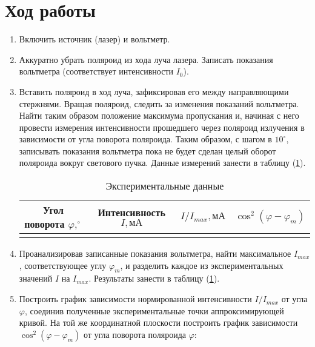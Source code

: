 \documentclass[12pt]{article}
\let\oldref\ref
\renewcommand{\ref}[1]{(\oldref{#1})}
\begin{document}
    \section*{Ход работы}
    \begin{enumerate}[wide, labelwidth=!, labelindent=0pt]
        \item Включить источник (лазер) и вольтметр.
        \item Аккуратно убрать поляроид из хода луча лазера. Записать показания вольтметра (соответствует интенсивности  $ I_0 $).
        \item Вставить поляроид в ход луча, зафиксировав его между направляющими стержнями. Вращая поляроид, следить за изменения показаний вольтметра. Найти таким образом положение максимума пропускания и, начиная с него провести измерения интенсивности прошедшего через поляроид излучения в зависимости от угла поворота поляроида. Таким образом, с шагом в $ 10^\circ $, записывать показания вольтметра пока не будет сделан целый оборот поляроида вокруг светового пучка. Данные измерений занести в таблицу \ref{tab:1}.
        \begin{table}[h!]
            \caption{Экспериментальные данные}
            \label{tab:1}
            \centering
            \begin{tabular}{|c|c|c|c|}
                \hline
                Угол поворота $ \varphi, ^\circ $    &  Интенсивность $ I, мА $ &  $ I/I_{max}, мА $ & $ \cos^2{(\varphi - \varphi_m)} $ \\
                \hline                
                \multicolumn{4}{|c|}{ %
                }  \\          
                \hline   
            \end{tabular}
        \end{table}
        \item Проанализировав записанные показания вольтметра, найти максимальное $ I_{max} $, соответствующее углу $ \varphi_m $, и разделить каждое из экспериментальных значений $ I $ на $ I_{max} $. Результаты занести в таблицу \ref{tab:1}. 
        \item Построить график зависимости нормированной интенсивности $ I/I_{max} $ от угла $ \varphi $, соединив полученные экспериментальные точки аппроксимирующей кривой. На той же координатной плоскости построить график зависимости $ \cos^2{(\varphi - \varphi_m)} $ от угла поворота поляроида $ \varphi $:
        \begin{figure}[h!]

\end{figure}
\end{enumerate}
\end{document}
